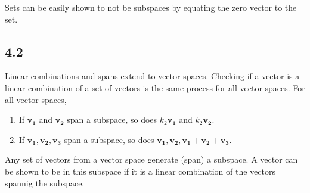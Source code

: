 \documentclass{article}
\begin{document}
    Sets can be easily shown to not be subspaces by equating the zero vector to the set.

    \subsection*{4.2}
    Linear combinations and spans extend to vector spaces. 
    Checking if a vector is a linear combination of a set of vectors 
    is the same process for all vector spaces.
    For all vector spaces,
    \begin{enumerate}
        \item If $\mathbf{v_1}$ and $\mathbf{v_2}$ span a subspace, so does $k_2 \mathbf{v_1}$ and $k_2 \mathbf{v_2}$.
        \item If $\mathbf{v_1, v_2, v_3}$ span a subspace, so does $\mathbf{v_1, v_2, v_1 + v_2 + v_3}$.
    \end{enumerate}

    Any set of vectors from a vector space generate (span) a subspace.
    A vector can be shown to be in this subspace if it is a linear combination of the vectors spannig the subspace.
\end{document}
